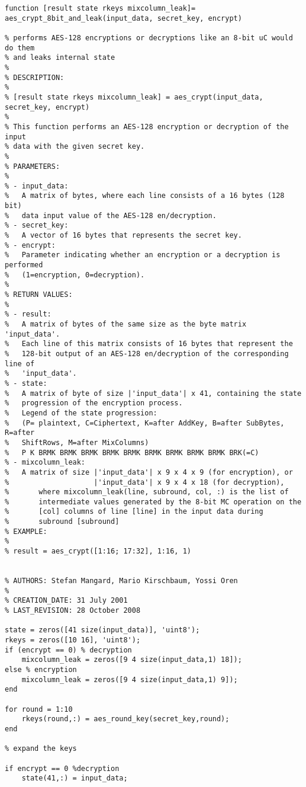 \begin{verbatim}
function [result state rkeys mixcolumn_leak]= 
aes_crypt_8bit_and_leak(input_data, secret_key, encrypt)

% performs AES-128 encryptions or decryptions like an 8-bit uC would do them
% and leaks internal state 
%
% DESCRIPTION:
%
% [result state rkeys mixcolumn_leak] = aes_crypt(input_data, secret_key, encrypt)
%
% This function performs an AES-128 encryption or decryption of the input
% data with the given secret key.
%
% PARAMETERS:
%
% - input_data:
%   A matrix of bytes, where each line consists of a 16 bytes (128 bit)
%   data input value of the AES-128 en/decryption.
% - secret_key:
%   A vector of 16 bytes that represents the secret key.
% - encrypt:
%   Parameter indicating whether an encryption or a decryption is performed
%   (1=encryption, 0=decryption).
%
% RETURN VALUES:
%
% - result:
%   A matrix of bytes of the same size as the byte matrix 'input_data'.
%   Each line of this matrix consists of 16 bytes that represent the
%   128-bit output of an AES-128 en/decryption of the corresponding line of
%   'input_data'.
% - state:
%   A matrix of byte of size |'input_data'| x 41, containing the state
%   progression of the encryption process.  
%   Legend of the state progression:
%   (P= plaintext, C=Ciphertext, K=after AddKey, B=after SubBytes, R=after
%   ShiftRows, M=after MixColumns)
%   P K BRMK BRMK BRMK BRMK BRMK BRMK BRMK BRMK BRMK BRK(=C)
% - mixcolumn_leak:
%   A matrix of size |'input_data'| x 9 x 4 x 9 (for encryption), or
%                    |'input_data'| x 9 x 4 x 18 (for decryption),
%       where mixcolumn_leak(line, subround, col, :) is the list of
%       intermediate values generated by the 8-bit MC operation on the
%       [col] columns of line [line] in the input data during
%       subround [subround]
% EXAMPLE:
%
% result = aes_crypt([1:16; 17:32], 1:16, 1)


% AUTHORS: Stefan Mangard, Mario Kirschbaum, Yossi Oren
%
% CREATION_DATE: 31 July 2001
% LAST_REVISION: 28 October 2008

state = zeros([41 size(input_data)], 'uint8');
rkeys = zeros([10 16], 'uint8');
if (encrypt == 0) % decryption
    mixcolumn_leak = zeros([9 4 size(input_data,1) 18]);
else % encryption
    mixcolumn_leak = zeros([9 4 size(input_data,1) 9]);
end

for round = 1:10
    rkeys(round,:) = aes_round_key(secret_key,round);
end

% expand the keys

if encrypt == 0 %decryption
    state(41,:) = input_data;


\end{verbatim}
